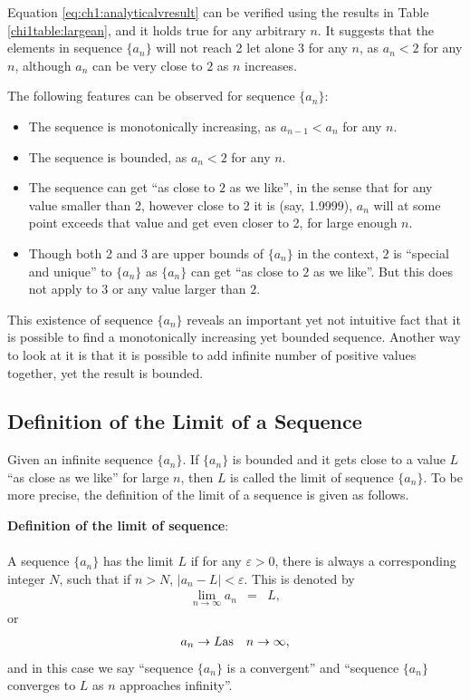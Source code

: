 Equation \eqref{eq:ch1:analyticalvresult} can be verified using the results in Table \ref{chi1table:largean}, and it holds true for any arbitrary $n$. It suggests that the elements in sequence $\{a_n\}$ will not reach 2 let alone 3 for any $n$, as $a_n<2$ for any $n$, although $a_n$ can be very close to $2$ as $n$ increases.

The following features can be observed for sequence $\{a_n\}$:
\begin{itemize}
  \item The sequence is monotonically increasing, as $a_{n-1}<a_n$ for any $n$.
  \item The sequence is bounded, as $a_n<2$ for any $n$.
  \item The sequence can get ``as close to $2$ as we like'', in the sense that for any value smaller than 2, however close to 2 it is (say, 1.9999), $a_n$ will at some point exceeds that value and get even closer to 2, for large enough $n$.
  \item Though both 2 and 3 are upper bounds of $\{a_n\}$ in the context, $2$ is ``special and unique'' to $\{a_n\}$ as $\{a_n\}$ can get ``as close to $2$ as we like''. But this does not apply to $3$ or any value larger than $2$.
\end{itemize}

This existence of sequence $\{a_n\}$ reveals an important yet not intuitive fact that it is possible to find a monotonically increasing yet bounded sequence. Another way to look at it is that it is possible to add infinite number of positive values together, yet the result is bounded.

\subsection{Definition of the Limit of a Sequence} \label{ch1subsec:definationoflimitofsequence}

Given an infinite sequence $\{a_n\}$. If $\{a_n\}$ is bounded and it gets close to a value $L$ ``as close as we like'' for large $n$, then $L$ is called the limit of sequence $\{a_n\}$. To be more precise, the definition of the limit of a sequence is given as follows.

\begin{VF}
\textbf{Definition of the limit of sequence}:
\\
\\
\noindent A sequence $\{a_n\}$ has the limit $L$ if for any $\varepsilon > 0$, there is always a corresponding integer $N$, such that if $n>N$, $|a_n-L|<\varepsilon$. This is denoted by
\begin{eqnarray}
  \lim_{n\rightarrow \infty} a_n &=& L, \nonumber
\end{eqnarray}
or
\begin{eqnarray}
  a_n \rightarrow L  & \textup{as} & n \rightarrow \infty, \nonumber
\end{eqnarray}
and in this case we say ``sequence $\{a_n\}$ is a convergent'' and ``sequence $\{a_n\}$ converges to $L$ as $n$ approaches infinity''.
\end{VF}

